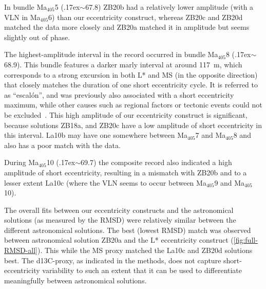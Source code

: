 \documentclass[draft]{agujournal2019}
\newcommand{\appr}{\raise.17ex\hbox{\(\scriptstyle\sim\)}} %
\newcommand{\ma}[1]{Ma\(_{405}\)#1} %
\begin{document}
In bundle \ma{5} (\appr\qty{67.8}{\millionyearago}) ZB20b had a relatively lower amplitude (with a \gls{VLN} in \ma{6}) than our eccentricity construct, whereas ZB20c and ZB20d matched the data more closely and ZB20a matched it in amplitude but seems slightly out of phase.

The highest-amplitude interval in the record occurred in bundle \ma{8} (\appr\qty{68.9}{\millionyearago}).
This bundle features a darker marly interval at around \qty{117}{\metre}, which corresponds to a strong excursion in both \gls{L*} and \gls{MS} (in the opposite direction) that closely matches the duration of one short eccentricity cycle.
It is referred to as ``escal\'{o}n'', and was previously also associated with a short eccentricity maximum, while other causes such as regional factors or tectonic events could not be excluded~\cite{Dinares-Turell2013}.
This high amplitude of our eccentricity construct is significant, because solutions ZB18a, and ZB20c have a low amplitude of short eccentricity in this interval.
La10b may have one somewhere between \ma{7} and \ma{8} and also has a poor match with the data.

During \ma{10} (\appr\qty{69.7}{\millionyearago}) the composite record also indicated a high amplitude of short eccentricity, resulting in a mismatch with ZB20b and to a lesser extent La10c (where the \gls{VLN} seems to occur between \ma{9} and \ma{10}).

The overall fits between our eccentricity constructs and the astronomical solutions (as measured by the \gls{RMSD}) were relatively similar between the different astronomical solutions.
The best (lowest \gls{RMSD}) match was observed between astronomical solution ZB20a and the \gls{L*} eccentricity construct (\cref{fig:full-RMSD-all}).
This while the \gls{MS} proxy matched the La10c and ZB20d solutions best.
The \gls{d13C}-proxy, as indicated in the methods, does not capture short-eccentricity variability to such an extent that it can be used to differentiate meaningfully between astronomical solutions.
\end{document}
